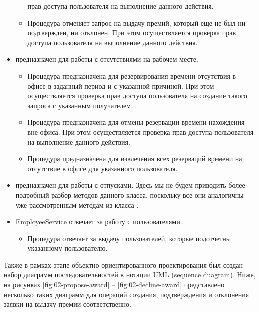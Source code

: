 \begin{itemize}
\begin{itemize}
            прав доступа пользователя  на выполнение данного действия.
        \item Процедура  отменяет запрос на выдачу премий, который еще не был ни подтвержден, ни отклонен. При этом     
            осуществляется проверка прав доступа пользователя  на выполнение данного действия.
    \end{itemize}
    \item {} предназначен для работы с отсутствиями на рабочем месте.
    \begin{itemize}
        \item Процедура  предназначена для резервирования времени отсутствия в офисе в заданный период и с указанной причиной.
            При этом осуществляется проверка прав доступа пользователя  на создание такого запроса с указанным получателем.
        \item Процедура  предназначена для отмены резервации времени нахождения вне офиса. При этом осуществляется проверка 
            прав доступа пользователя  на выполнение данного действия.
        \item Процедура  предназначена для извлечения всех резерваций времени на отсутствие в офисе для указанного 
            пользователя.
    \end{itemize}
    \item {} предназначен для работы с отпусками. Здесь мы не будем приводить более подробный разбор методов данного 
        класса, поскольку все они аналогичны уже рассмотренным методам из класса .
    \item EmployeeService отвечает за работу с пользователями.
    \begin{itemize}
        \item Процедура  отвечает за выдачу пользователей, которые подотчетны указанному пользователю.
    \end{itemize}
\end{itemize}

Также в рамках этапе объектно-ориентированного проектирования был создан набор диаграмм последовательностей в нотации UML (sequence duagram).
Ниже, на рисунках \ref{fig:02-propose-award} -- \ref{fig:02-decline-award} представлено несколько таких диаграмм для операций создания,
подтверждения и отклонения заявки на выдачу премии соответственно.

